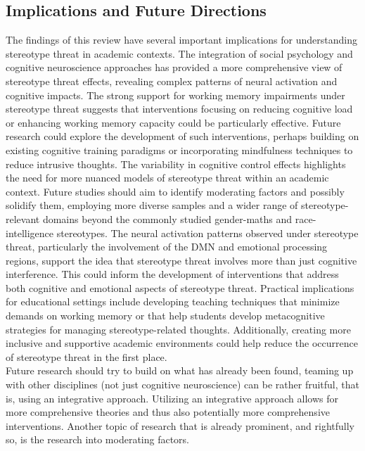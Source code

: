 \documentclass[
  stu, a4paper,floatsintext]{apa7}
\begin{document}
\subsection{Implications and Future Directions}\label{implications-and-future-directions}

The findings of this review have several important implications for understanding stereotype threat in academic contexts. The integration of social psychology and cognitive neuroscience approaches has provided a more comprehensive view of stereotype threat effects, revealing complex patterns of neural activation and cognitive impacts.
The strong support for working memory impairments under stereotype threat suggests that interventions focusing on reducing cognitive load or enhancing working memory capacity could be particularly effective.
Future research could explore the development of such interventions, perhaps building on existing cognitive training paradigms or incorporating mindfulness techniques to reduce intrusive thoughts.
The variability in cognitive control effects highlights the need for more nuanced models of stereotype threat within an academic context.
Future studies should aim to identify moderating factors and possibly solidify them, employing more diverse samples and a wider range of stereotype-relevant domains beyond the commonly studied gender-maths and race-intelligence stereotypes.
The neural activation patterns observed under stereotype threat, particularly the involvement of the DMN and emotional processing regions, support the idea that stereotype threat involves more than just cognitive interference.
This could inform the development of interventions that address both cognitive and emotional aspects of stereotype threat.
Practical implications for educational settings include developing teaching techniques that minimize demands on working memory or that help students develop metacognitive strategies for managing stereotype-related thoughts.
Additionally, creating more inclusive and supportive academic environments could help reduce the occurrence of stereotype threat in the first place.\\
Future research should try to build on what has already been found, teaming up with other disciplines (not just cognitive neuroscience) can be rather fruitful, that is, using an integrative approach.
Utilizing an integrative approach allows for more comprehensive theories and thus also potentially more comprehensive interventions.
Another topic of research that is already prominent, and rightfully so, is the research into moderating factors.
\end{document}
